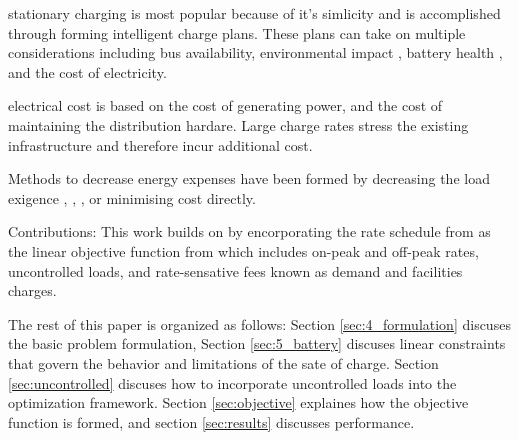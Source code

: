\par stationary charging is most popular because of it's simlicity and is accomplished through forming intelligent charge plans. These plans can take on multiple considerations including bus availability, environmental impact \cite{zhou_bi-objective_2021}, battery health \cite{houbbadi_optimal_2019}, and the cost of electricity.
\par electrical cost is based on the cost of generating power, and the cost of maintaining the distribution hardare. Large charge rates stress the existing infrastructure and therefore incur additional cost.
\par Methods to decrease energy expenses have been formed by decreasing the load exigence \cite{cheng_smart_2020}, \cite{ojer_development_2020}, \cite{qin_numerical_2016}, \cite{bagherinezhad_spatio-temporal_2020} or minimising cost directly.
\par Contributions: This work builds on \cite{brown_position_nodate} by encorporating the rate schedule from \cite{rocky_mountain_power_rocky_2021} as the linear objective function from \cite{mortensen_comprehensive_2021} which includes on-peak and off-peak rates, uncontrolled loads, and rate-sensative fees known as demand and facilities charges.  
\par The rest of this paper is organized as follows: Section \ref{sec:4_formulation} discuses the basic problem formulation, Section \ref{sec:5_battery} discuses linear constraints that govern the behavior and limitations of the sate of charge. Section \ref{sec:uncontrolled} discuses how to incorporate uncontrolled loads into the optimization framework. Section \ref{sec:objective} explaines how the objective function is formed, and section \ref{sec:results} discusses performance.
